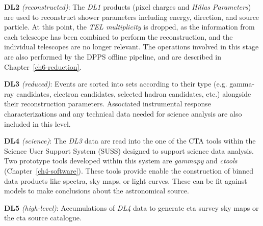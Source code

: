 \textbf{DL2} \textit{(reconstructed)}: The \textit{DL1} products (pixel charges and \textit{Hillas Parameters}) are used to reconstruct shower parameters including energy, direction, and source particle. At this point, the \textit{TEL multiplicity} is dropped, as the information from each telescope has been combined to perform the reconstruction, and the individual telescopes are no longer relevant. The operations involved in this stage are also performed by the DPPS offline pipeline, and are described in Chapter~\ref{ch6-reduction}.

\textbf{DL3} \textit{(reduced)}:
Events are sorted into sets according to their type (e.g. gamma-ray candidates, electron candidates, selected hadron
candidates, etc.) alongside their reconstruction parameters. Associated instrumental response characterizations and any technical data needed for
science analysis are also included in this level.

\textbf{DL4} \textit{(science)}:
The \textit{DL3} data are read into the one of  the CTA tools within the Science User Support System (SUSS) designed to support science data analysis. Two prototype tools developed within this system are \textit{gammapy} and \textit{ctools} (Chapter~\ref{ch4-software}). These tools provide enable the construction of binned data products like spectra, sky maps, or light curves. These can be fit against models to make conclusions about the astronomical source.

\textbf{DL5} \textit{(high-level)}:
Accumulations of \textit{DL4} data to generate \gls{cta} survey sky maps or the \gls{cta}
source catalogue.